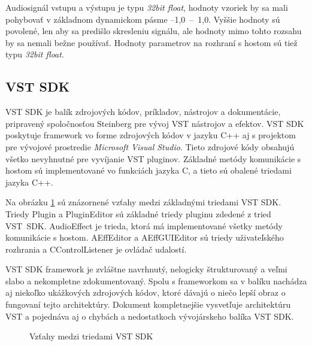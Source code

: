 Audiosignál vstupu a výstupu je typu \emph{32bit float}, hodnoty vzoriek by sa mali pohybovať v základnom dynamickom pásme --1,0~--~1,0. Vyššie hodnoty sú povolené, len aby sa predišlo skresleniu signálu, ale hodnoty mimo tohto rozsahu by sa nemali bežne používať. Hodnoty parametrov na rozhraní s hostom sú tiež typu \emph{32bit float}.

\subsection{VST SDK}



VST SDK je balík zdrojových kódov, príkladov, nástrojov a dokumentácie, pripravený spoločnosťou Steinberg pre vývoj VST nástrojov a efektov. VST SDK poskytuje framework vo forme zdrojových kódov v jazyku C++ aj s projektom pre vývojové prostredie \emph{Microsoft Visual Studio}. Tieto zdrojové kódy obsahujú všetko nevyhnutné pre vyvíjanie VST pluginov. Základné metódy komunikácie s hostom sú implementované vo funkciách jazyka C, a tieto sú obalené triedami jazyka C++.

Na obrázku \ref{obr04} sú znázornené vzťahy medzi základnými triedami VST SDK. Triedy Plugin a PluginEditor sú základné triedy pluginu zdedené z tried VST~SDK. AudioEffect je trieda, ktorá má implementované všetky metódy komunikácie s hostom. AEffEditor a AEffGUIEditor sú triedy uživateľského rozhrania a CControlListener je ovládač udalostí.

VST SDK framework je zvláštne navrhnutý, nelogicky štrukturovaný a veľmi slabo a nekompletne zdokumentovaný. Spolu s frameworkom sa v balíku nachádza aj niekoľko ukážkových zdrojových kódov, ktoré dávajú o niečo lepší obraz o fungovaní tejto architektúry. Dokument \cite{b06} kompletnejšie vysvetľuje architektúru VST a pojednáva aj o chybách a nedostatkoch vývojárskeho balíka VST SDK.

\begin{figure}[t]
\centering
{}
\caption{\label{obr04} Vzťahy medzi triedami VST SDK}
\end{figure}



